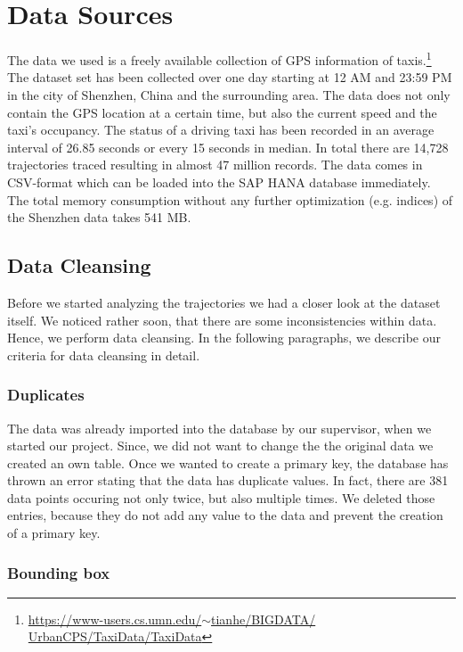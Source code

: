 \documentclass[10pt]{sig-alternate}
\begin{document}
\section{Data Sources}
\label{sec:ds}

The data we used is a freely available collection of GPS information of taxis.\footnote{\href{https://www-users.cs.umn.edu/~tianhe/BIGDATA/UrbanCPS/TaxiData/TaxiData}{https://www-users.cs.umn.edu/$\sim$tianhe/BIGDATA/\\UrbanCPS/TaxiData/TaxiData}} The dataset set has been collected over one day starting at 12 AM and 23:59 PM in the city of Shenzhen, China and the surrounding area. The data does not only contain the GPS location at a certain time, but also the current speed and the taxi's occupancy. The status of a driving taxi has been recorded in an average interval of 26.85 seconds or every 15 seconds in median. In total there are 14,728 trajectories traced resulting in almost 47 million records. The data comes in CSV-format which can be loaded into the SAP HANA database immediately. The total memory consumption without any further optimization (e.g. indices) of the Shenzhen data takes 541 MB.

\subsection{Data Cleansing}
Before we started analyzing the trajectories we had a closer look at the dataset itself. We noticed rather soon, that there are some inconsistencies within data. Hence, we perform data cleansing. In the following paragraphs, we describe our criteria for data cleansing in detail.

\subsubsection{Duplicates}
The data was already imported into the database by our supervisor, when we started our project. Since, we did not want to change the the original data we created an own table. Once we wanted to create a primary key, the database has thrown an error stating that the data has duplicate values. In fact, there are 381 data points occuring not only twice, but also multiple times. We deleted those entries, because they do not add any value to the data and prevent the creation of a primary key.

\subsubsection{Bounding box}
\end{document}
